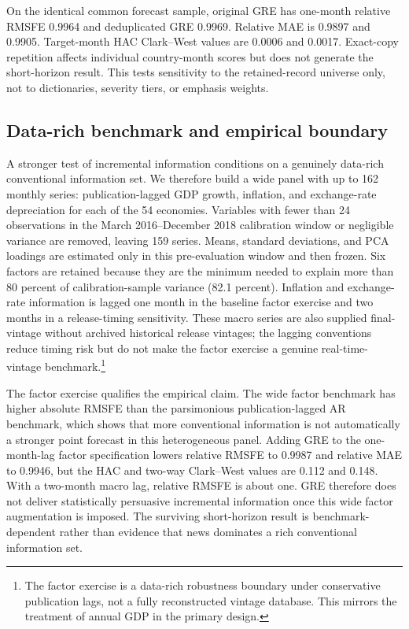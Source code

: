 \documentclass[preprint,12pt,authoryear]{elsarticle}
\begin{document}


On the identical common forecast sample, original GRE has one-month relative
RMSFE 0.9964 and deduplicated GRE 0.9969. Relative MAE is 0.9897 and 0.9905.
Target-month HAC Clark--West values are 0.0006 and 0.0017. Exact-copy
repetition affects individual country-month scores but does not generate the
short-horizon result. This tests sensitivity to the retained-record universe
only, not to dictionaries, severity tiers, or emphasis weights.

\subsection{Data-rich benchmark and empirical boundary}

A stronger test of incremental information conditions on a genuinely
data-rich conventional information set. We therefore build a wide panel with
up to 162 monthly series: publication-lagged GDP growth, inflation, and
exchange-rate depreciation for each of the 54 economies. Variables with fewer
than 24 observations in the March 2016--December 2018 calibration window or
negligible variance are removed, leaving 159 series. Means, standard
deviations, and PCA loadings are estimated only in this pre-evaluation window
and then frozen. Six factors are retained because they are the minimum needed
to explain more than 80 percent of calibration-sample variance (82.1 percent).
Inflation and exchange-rate information is lagged one month in the baseline
factor exercise and two months in a release-timing sensitivity. These macro
series are also supplied final-vintage without archived historical release
vintages; the lagging conventions reduce timing risk but do not make the factor
exercise a genuine real-time-vintage benchmark.\footnote{The factor exercise
is a data-rich robustness boundary under conservative publication lags, not a
fully reconstructed vintage database. This mirrors the treatment of annual GDP
in the primary design.}



The factor exercise qualifies the empirical claim. The wide factor benchmark
has higher absolute RMSFE than the parsimonious publication-lagged AR
benchmark, which shows that more conventional information is not automatically
a stronger point forecast in this heterogeneous panel. Adding GRE to the
one-month-lag factor specification lowers relative RMSFE to 0.9987 and relative
MAE to 0.9946, but the HAC and two-way Clark--West values are 0.112 and 0.148.
With a two-month macro lag, relative RMSFE is about one. GRE therefore does not
deliver statistically persuasive incremental information once this wide factor
augmentation is imposed. The surviving short-horizon result is
benchmark-dependent rather than evidence that news dominates a rich
conventional information set.
\end{document}
